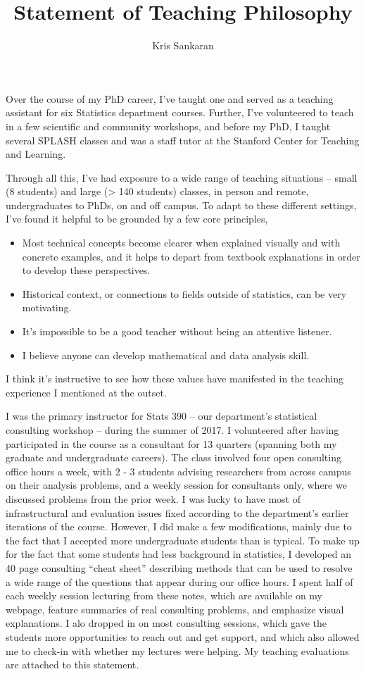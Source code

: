 \documentclass{article}
\title{Statement of Teaching Philosophy}
\author{Kris Sankaran}
\begin{document}
\maketitle

Over the course of my PhD career, I've taught one and served as a teaching
assistant for six Statistics department courses. Further, I've volunteered to
teach in a few scientific and community workshops, and before my PhD, I taught
several SPLASH classes and was a staff tutor at the Stanford Center for Teaching
and Learning.

Through all this, I've had exposure to a wide range of teaching situations --
small (8 students) and large (> 140 students) classes, in person and remote,
undergraduates to PhDs, on and off campus. To adapt to these different
settings, I've found it helpful to be grounded by a few core principles,

\begin{itemize}
  \item Most technical concepts become clearer when explained visually and with
    concrete examples, and it helps to depart from textbook explanations in
    order to develop these perspectives.
  \item Historical context, or connections to fields outside of statistics, can
    be very motivating.
  \item It's impossible to be a good teacher without being an attentive
    listener.
  \item I believe anyone can develop mathematical and data analysis skill.
\end{itemize}

I think it's instructive to see how these values have manifested in the teaching
experience I mentioned at the outset.

I was the primary instructor for Stats 390 -- our department's statistical
consulting workshop -- during the summer of 2017. I volunteered after having
participated in the course as a consultant for 13 quarters (spanning both my
graduate and undergraduate careers). The class involved four open consulting
office hours a week, with 2 - 3 students advising researchers from across campus
on their analysis problems, and a weekly session for consultants only, where we
discussed problems from the prior week. I was lucky to have most of
infrastructural and evaluation issues fixed according to the department's
earlier iterations of the course. However, I did make a few modifications,
mainly due to the fact that I accepted more undergraduate students than is
typical. To make up for the fact that some students had less background in
statistics, I developed an ~ 40 page consulting ``cheat sheet'' describing
methods that can be used to resolve a wide range of the questions that appear
during our office hours. I spent half of each weekly session lecturing from
these notes, which are available on my webpage, feature summaries of real
consulting problems, and emphasize visual explanations. I alo dropped in on most
consulting sessions, which gave the students more opportunities to reach out and
get support, and which also allowed me to check-in with whether my lectures were
helping. My teaching evaluations are attached to this statement.
\end{document}
